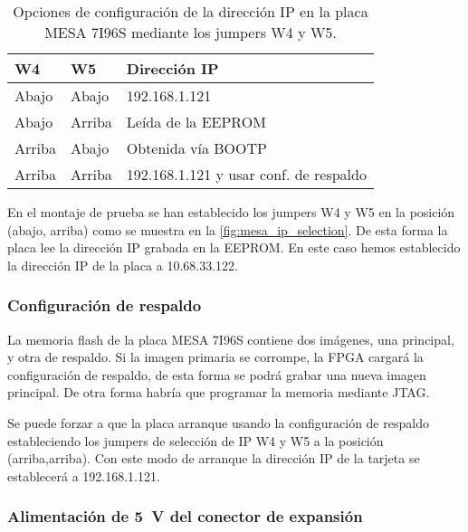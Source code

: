 \documentclass[english,spanish,a4paper,11pt]{article}
\begin{document}
\begin{table}[!ht]
    \centering
    \begin{tabular}{lll}
        \toprule
        W4 & W5 & Dirección IP \\
        \midrule
        Abajo  & Abajo  & 192.168.1.121 \\
        Abajo  & Arriba & Leída de la EEPROM \\
        Arriba & Abajo  & Obtenida vía BOOTP \\
        Arriba & Arriba & 192.168.1.121 y usar conf. de respaldo \\
        \bottomrule
    \end{tabular}
    \caption{Opciones de configuración de la dirección IP en la placa MESA 7I96S mediante los jumpers W4 y W5.}
    \label{tab:mesa_ip_selection}
\end{table}


En el montaje de prueba se han establecido los jumpers W4 y W5 en la posición (abajo, arriba) como se muestra en la \cref{fig:mesa_ip_selection}. De esta forma la placa lee la dirección IP grabada en la EEPROM. En este caso hemos establecido la dirección IP de la placa a 10.68.33.122.


\subsubsection{Configuración de respaldo}
\label{sec:mesa7i96s_fallback}

La memoria flash de la placa MESA 7I96S contiene dos imágenes, una principal, y otra de respaldo. Si la imagen primaria se corrompe, la FPGA cargará la configuración de respaldo, de esta forma se podrá grabar una nueva imagen principal. De otra forma habría que programar la memoria mediante JTAG.

Se puede forzar a que la placa arranque usando la configuración de respaldo estableciendo los jumpers de selección de IP W4 y W5 a la posición (arriba,arriba). Con este modo de arranque la dirección IP de la tarjeta se establecerá a 192.168.1.121.


\subsubsection{Alimentación de \qty{5}{\V} del conector de expansión}
\label{sec:mesa7i96s_cable_power}
\end{document}
